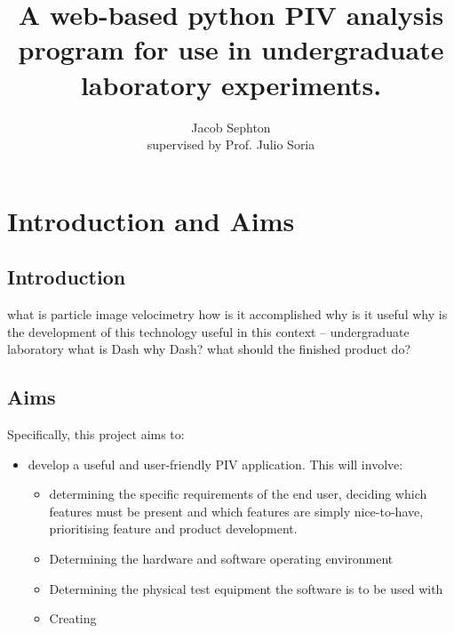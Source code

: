 \documentclass[12pt, a4paper]{amsart}
\title{A web-based python PIV analysis program for use in undergraduate laboratory experiments.}
\author{Jacob Sephton\\ supervised by Prof. Julio Soria}
\begin{document}
\maketitle

\section{Introduction and Aims}
\subsection{Introduction}
what is particle image velocimetry
how is it accomplished
why is it useful
why is the development of this technology useful in this context -- undergraduate laboratory
what is Dash
why Dash?
what should the finished product do?

\subsection{Aims}
Specifically, this project aims to:
\begin{itemize}
\item develop a useful and user-friendly PIV application. This will involve: 
\begin{itemize}
	\item determining the specific requirements of the end user, deciding which features must be present and which features are simply nice-to-have, prioritising feature and product development.
	\item Determining the hardware and software operating environment \cite{worksafe}
	\item Determining the physical test equipment the software is to be used with \cite{wikipiv}
	\item Creating 
\end{itemize}
\end{itemize}



\end{document}
